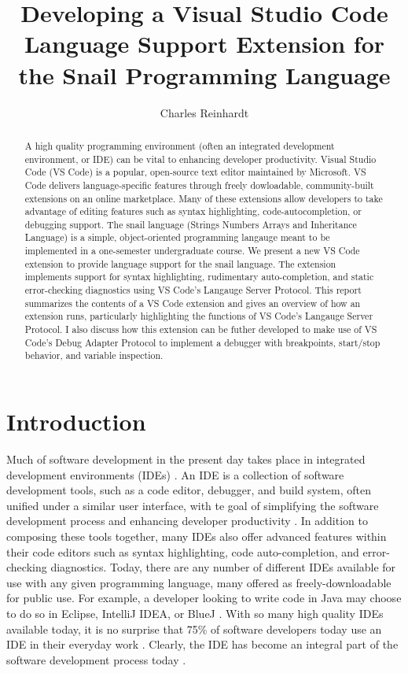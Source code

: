 \documentclass{article}
\title{Developing a Visual Studio Code Language Support Extension for the Snail Programming Language}
\author{Charles Reinhardt}
\begin{document}
\maketitle

\begin{abstract}

    A high quality programming environment (often an integrated development environment, or IDE) can be vital to enhancing developer productivity. Visual Studio Code (VS Code) is a popular, open-source text editor maintained by Microsoft. VS Code delivers language-specific features through freely dowloadable, community-built extensions on an online marketplace. Many of these extensions allow developers to take advantage of editing features such as syntax highlighting, code-autocompletion, or debugging support. The snail language (Strings Numbers Arrays and Inheritance Language) is a simple, object-oriented programming langauge meant to be implemented in a one-semester undergraduate course. We present a new VS Code extension to provide language support for the snail language. The extension implements support for syntax highlighting, rudimentary auto-completion, and static error-checking diagnostics using VS Code's Langauge Server Protocol. This report summarizes the contents of a VS Code extension and gives an overview of how an extension runs, particularly highlighting the functions of VS Code's Langauge Server Protocol. I also discuss how this extension can be futher developed to make use of VS Code's Debug Adapter Protocol to implement a debugger with breakpoints, start/stop behavior, and variable inspection.

\end{abstract}

\section{Introduction}

Much of software development in the present day takes place in integrated development environments (IDEs) \cite{JetBrains_2019}. An IDE is a collection of software development tools, such as a code editor, debugger, and build system, often unified under a similar user interface, with te goal of simplifying the software development process and enhancing developer productivity \cite{Gillis_Silverthorne_2018,Shyniaieva_2023}. In addition to composing these tools together, many IDEs also offer advanced features within their code editors such as syntax highlighting, code auto-completion, and error-checking diagnostics. Today, there are any number of different IDEs available for use with any given programming language, many offered as freely-downloadable for public use. For example, a developer looking to write code in Java may choose to do so in Eclipse, IntelliJ IDEA, or BlueJ \cite{EclipseFoundation_2023, JetBrains_2023,KingsProgrammingEducationToolsGroup_2022}. With so many high quality IDEs available today, it is no surprise that 75\% of software developers today use an IDE in their everyday work \cite{JetBrains_2019}. Clearly, the IDE has become an integral part of the software development process today \cite{Vaniukov_2023}. 
\end{document}
